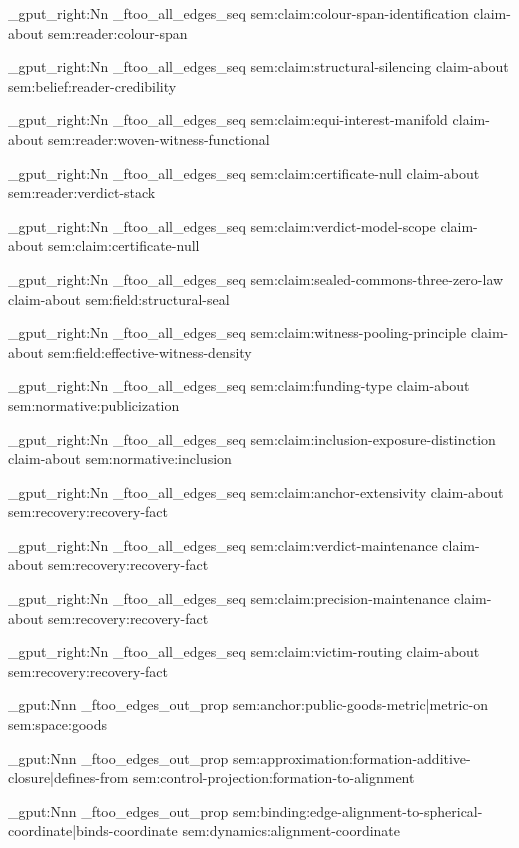 \seq_gput_right:Nn \g_ftoo_all_edges_seq { { sem:claim:colour-span-identification } { claim-about } { sem:reader:colour-span } }

\seq_gput_right:Nn \g_ftoo_all_edges_seq { { sem:claim:structural-silencing } { claim-about } { sem:belief:reader-credibility } }

\seq_gput_right:Nn \g_ftoo_all_edges_seq { { sem:claim:equi-interest-manifold } { claim-about } { sem:reader:woven-witness-functional } }

\seq_gput_right:Nn \g_ftoo_all_edges_seq { { sem:claim:certificate-null } { claim-about } { sem:reader:verdict-stack } }

\seq_gput_right:Nn \g_ftoo_all_edges_seq { { sem:claim:verdict-model-scope } { claim-about } { sem:claim:certificate-null } }

\seq_gput_right:Nn \g_ftoo_all_edges_seq { { sem:claim:sealed-commons-three-zero-law } { claim-about } { sem:field:structural-seal } }

\seq_gput_right:Nn \g_ftoo_all_edges_seq { { sem:claim:witness-pooling-principle } { claim-about } { sem:field:effective-witness-density } }

\seq_gput_right:Nn \g_ftoo_all_edges_seq { { sem:claim:funding-type } { claim-about } { sem:normative:publicization } }

\seq_gput_right:Nn \g_ftoo_all_edges_seq { { sem:claim:inclusion-exposure-distinction } { claim-about } { sem:normative:inclusion } }

\seq_gput_right:Nn \g_ftoo_all_edges_seq { { sem:claim:anchor-extensivity } { claim-about } { sem:recovery:recovery-fact } }

\seq_gput_right:Nn \g_ftoo_all_edges_seq { { sem:claim:verdict-maintenance } { claim-about } { sem:recovery:recovery-fact } }

\seq_gput_right:Nn \g_ftoo_all_edges_seq { { sem:claim:precision-maintenance } { claim-about } { sem:recovery:recovery-fact } }

\seq_gput_right:Nn \g_ftoo_all_edges_seq { { sem:claim:victim-routing } { claim-about } { sem:recovery:recovery-fact } }



\prop_gput:Nnn \g_ftoo_edges_out_prop { sem:anchor:public-goods-metric|metric-on } { sem:space:goods }

\prop_gput:Nnn \g_ftoo_edges_out_prop { sem:approximation:formation-additive-closure|defines-from } { sem:control-projection:formation-to-alignment }

\prop_gput:Nnn \g_ftoo_edges_out_prop { sem:binding:edge-alignment-to-spherical-coordinate|binds-coordinate } { sem:dynamics:alignment-coordinate }

